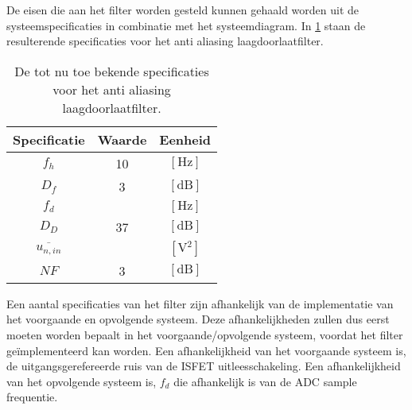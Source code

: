 De eisen die aan het filter worden gesteld kunnen gehaald worden uit de systeemspecificaties in combinatie met het systeemdiagram. In \cref{tab:prelimenarySpecsAAfilter} staan de resulterende specificaties voor het anti aliasing laagdoorlaatfilter.
\begin{table}[!htb]
    \centering
    \begin{tabular}{c|c|c}
        Specificatie & Waarde & Eenheid \\\hline
        $f_h$ & 10 & $[\si{\hertz}]$\\
        $D_f$ & 3   & $[\mathrm{dB}]$ \\
        $f_d$ &  & $[\si{\hertz}]$ \\
        $D_D$ & 37   & $[\mathrm{dB}]$ \\
        $\overline{u_{n,in}}$ & & $[\si{\volt^2}]$\\
        $NF$ & 3 & $[\mathrm{dB}]$
    \end{tabular}
    \caption{De tot nu toe bekende specificaties voor het anti aliasing laagdoorlaatfilter.}
    \label{tab:prelimenarySpecsAAfilter}
\end{table}

Een aantal specificaties van het filter zijn afhankelijk van de implementatie van het voorgaande en opvolgende systeem. Deze afhankelijkheden zullen dus eerst moeten worden bepaalt in het voorgaande/opvolgende systeem, voordat het filter geïmplementeerd kan worden. Een afhankelijkheid van het voorgaande systeem is, de uitgangsgerefereerde ruis van de ISFET uitleesschakeling.
Een afhankelijkheid van het opvolgende systeem is, $f_d$ die afhankelijk is van de ADC sample frequentie.